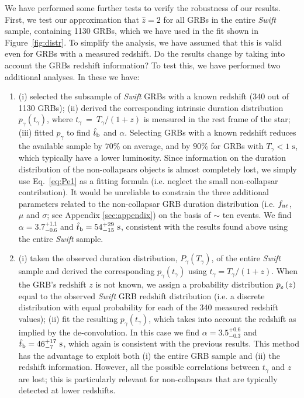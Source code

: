\documentclass[useAMS,usenatbib]{mn2e}
\begin{document}
We have performed some further tests to verify the robustness of our results. First, we test our approximation that $\hat{z}=2$ for all GRBs in the entire {\it Swift} sample, containing 1130 GRBs, which we have used in the fit shown in Figure~\ref{fig:distr}. To simplify the analysis, we have assumed that this is valid even for GRBs with a measured redshift. Do the results change by taking into account the GRBs redshift information? To test this, we have performed two additional analyses. In these we have:
{
\renewcommand{\theenumi}{
{\bf Analysis \Alph{enumi}}:}
\begin{enumerate}
 \item (i) selected the subsample of {\it Swift} GRBs with a known redshift (340 out of 1130 GRBs); (ii) derived the corresponding intrinsic duration distribution $p_\gamma\left(t_\gamma\right)$, where $t_\gamma~=~T_\gamma/\left(1+z\right)$ is measured in the rest frame of the star; (iii) fitted $p_\gamma$ to find $\hat{t}_{\rm b}$ and $\alpha$. Selecting GRBs with a known redshift reduces the available sample by $70\%$ on average, and by $90\%$ for GRBs with $T_\gamma<1\text{ s}$, which typically have a lower luminosity. Since information on the duration distribution of the non-collapsars objects is almost completely lost, we simply use Eq.~\eqref{eq:Pe1} as a fitting formula (i.e. neglect the small non-collapsar contribution). It would be unreliable to constrain the three additional parameters related to the non-collapsar GRB duration distribution (i.e. $f_{\rm nc}$, $\mu$ and $\sigma$; see Appendix \ref{sec:appendix}) on the basis of $\sim$ ten events.
 We find $\alpha=3.7_{-0.6}^{+1.1}$ and $\hat{t}_{\rm b}=54_{-15}^{+29}\text{ s}$, consistent with the results found above using the entire {\it Swift} sample.
 
\item (i) taken the observed duration distribution, $P_\gamma\left(T_\gamma\right)$, of the entire {\it Swift} sample and derived the corresponding $p_\gamma\left(t_\gamma\right)$ using $t_\gamma= T_\gamma/\left(1+z\right)$. When the GRB's redshift $z$ is not known, we assign a probability distribution $p_{\rm z}\left(z\right)$ equal to the observed {\it Swift} GRB redshift distribution (i.e. a discrete distribution with equal probability for each of the 340 measured redshift values);
(ii) fit the resulting $p_\gamma\left(t_\gamma\right)$, which takes into account the redshift as implied by the de-convolution.  In this case we find $\alpha=3.5_{-0.3}^{+0.6}$ and $\hat{t}_{\rm b}=46_{-7}^{+17}\text{ s}$, which again is consistent with the previous results. This method has the advantage to exploit both (i) the entire GRB sample and (ii) the redshift information. However, all the possible correlations between $t_\gamma$ and $z$ are lost; this is particularly relevant for non-collapsars that are typically detected at lower redshifts.
\end{enumerate}
}
\end{document}
